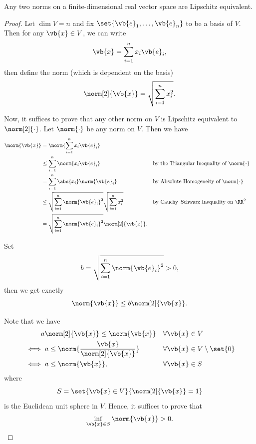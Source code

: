 \begin{theorem}
    Any two norms on a finite-dimensional real vector space are Lipschitz equivalent.
\end{theorem}

\begin{proof}
    Let \(\dim V = n\) and fix \(\set{\vb{e}_1, \ldots, \vb{e}_n}\) to be a basis of \(V\). Then for any \(\vb{x} \in V\), we can write
    \[
        \vb{x} = \sum_{i = 1}^n x_i \vb{e}_i,
    \]
    then define the norm (which is dependent on the basis)
    \[
        \norm[2]{\vb{x}} = \sqrt{\sum_{i = 1}^n x_i^2}.
    \]

    Now, it suffices to prove that any other norm on \(V\) is Lipschitz equivalent to \(\norm[2]{\cdot}\). Let \(\norm{\cdot}\) be any norm on \(V\). Then we have
    \begin{align*}
        \norm{\vb{x}} &= \norm{\sum_{i = 1}^{n} x_i \vb{e}_i} \\
        &\leq \sum_{i = 1}^{n} \norm{x_i \vb{e}_i} && \text{by the Triangular Inequality of }\norm{\cdot} \\
        &= \sum_{i = 1}^{n} \abs{x_i} \norm{\vb{e}_i} && \text{by Absolute Homogeneity of }\norm{\cdot} \\
        &\leq \sqrt{\sum_{i = 1}^{n} \norm{\vb{e}_i}^2} \sqrt{\sum_{i = 1}^{n} x_i^2} && \text{by Cauchy--Schwarz Inequality on } \RR^2 \\
        &= \sqrt{\sum_{i = 1}^{n} \norm{\vb{e}_i}^2} \norm[2]{\vb{x}}.
    \end{align*}

    Set
    \[
        b = \sqrt{\sum_{i = 1}^{n} \norm{\vb{e}_i}^2} > 0,
    \]
    then we get exactly
    \[
        \norm{\vb{x}} \leq b \norm[2]{\vb{x}}.
    \]

    Note that we have
    \begin{align*}
        &\phantom{\iff} a\norm[2]{\vb{x}} \leq \norm{\vb{x}} && \forall \vb{x} \in V \\
        &\iff a \leq \norm{\frac{\vb{x}}{\norm[2]{\vb{x}}}} && \forall \vb{x} \in V \setminus \set{0} \\
        &\iff a \leq \norm{\vb{x}}, && \forall \vb{x} \in S
    \end{align*}
    where
    \[
        S = \set{\vb{x} \in V}{\norm[2]{\vb{x}} = 1}
    \]
    is the Euclidean unit sphere in \(V\). Hence, it suffices to prove that
    \[
        \inf_{\vb{x} \in S} \norm{\vb{x}} > 0.
    \]


\end{proof}
